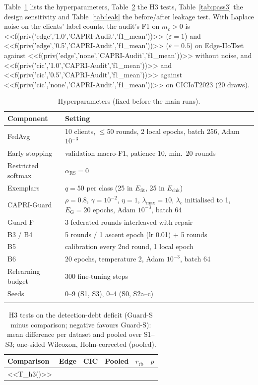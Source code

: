 \documentclass[pdflatex,sn-mathphys-num,iicol]{sn-jnl}
\newcommand{\Efit}{E_{\mathrm{fit}}}
\newcommand{\Echk}{E_{\mathrm{chk}}}
\begin{document}
\begin{appendices}
Table~\ref{tab:hyper} lists the hyperparameters, Table~\ref{tab:h3} the H3 tests, Table~\ref{tab:pass3} the design sensitivity and Table~\ref{tab:leak} the before/after leakage test. With Laplace noise on the clients' label counts, the audit's F1 on $m_c>0$ is <<f(priv('edge','1.0','CAPRI-Audit','f1_mean'))>> ($\varepsilon=1$) and <<f(priv('edge','0.5','CAPRI-Audit','f1_mean'))>> ($\varepsilon=0.5$) on Edge-IIoTset against <<f(priv('edge','none','CAPRI-Audit','f1_mean'))>> without noise, and <<f(priv('cic','1.0','CAPRI-Audit','f1_mean'))>> and <<f(priv('cic','0.5','CAPRI-Audit','f1_mean'))>> against <<f(priv('cic','none','CAPRI-Audit','f1_mean'))>> on CICIoT2023 (20 draws).

\begin{table}[!htbp]
\caption{Hyperparameters (fixed before the main runs).}\label{tab:hyper}
\scriptsize
\begin{tabular*}{\textwidth}{@{}p{1.9cm}p{5.4cm}@{}}
\toprule
Component & Setting \\
\midrule
FedAvg & 10 clients, $\le$50 rounds, 2 local epochs, batch 256, Adam $10^{-3}$ \\
Early stopping & validation macro-F1, patience 10, min.\ 20 rounds \\
Restricted softmax & $\alpha_{\mathrm{RS}}=0$~\cite{li2021fedrs} \\
Exemplars & $q=50$ per class (25 in $\Efit$, 25 in $\Echk$) \\
CAPRI-Guard & $\rho=0.8$, $\gamma=10^{-2}$, $\eta=1$, $\lambda_{\max}=10$, $\lambda_c$ initialised to 1, $E_{\mathrm{G}}=20$ epochs, Adam $10^{-3}$, batch 64 \\
Guard-F & 3 federated rounds interleaved with repair \\
B3 / B4 & 5 rounds / 1 ascent epoch (lr 0.01) + 5 rounds \\
B5 & calibration every 2nd round, 1 local epoch \\
B6 & 20 epochs, temperature 2, Adam $10^{-3}$, batch 64 \\
Relearning budget & 300 fine-tuning steps \\
Seeds & 0--9 (S1, S3), 0--4 (S0, S2a--c) \\
\botrule
\end{tabular*}
\end{table}

\begin{table}[!htbp]
\caption{H3 tests on the detection-debt deficit (Guard-S minus comparison; negative favours Guard-S): mean difference per dataset and pooled over S1--S3; one-sided Wilcoxon, Holm-corrected (pooled).}\label{tab:h3}
\scriptsize
\begin{tabular*}{\textwidth}{@{\extracolsep\fill}lccccc}
\toprule
Comparison & Edge & CIC & Pooled & $r_{\mathrm{rb}}$ & $p$ \\
\midrule
<<T_h3()>>
\botrule
\end{tabular*}
\end{table}


\end{appendices}
\end{document}

